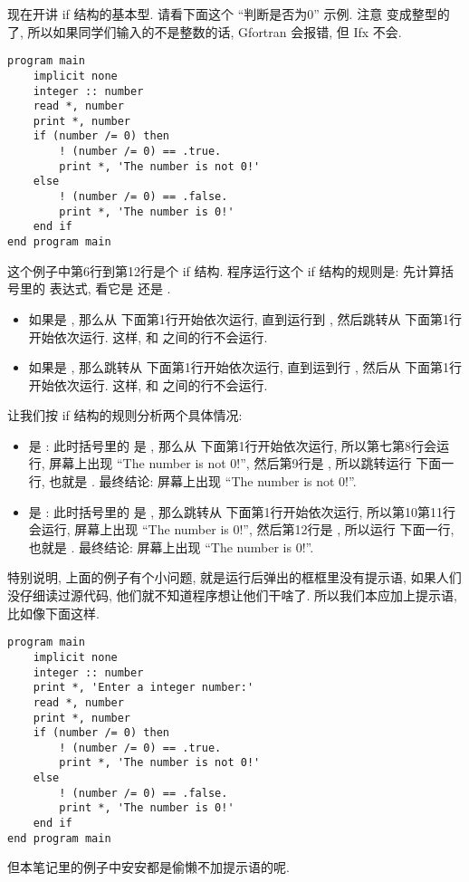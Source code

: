 现在开讲 if 结构的基本型. 请看下面这个 ``判断是否为0'' 示例. 注意  变成整型的了, 所以如果同学们输入的不是整数的话, Gfortran 会报错, 但 Ifx 不会.\label{whether_zero}
\begin{lstlisting}
program main
    implicit none
    integer :: number
    read *, number
    print *, number
    if (number /= 0) then
        ! (number /= 0) == .true.
        print *, 'The number is not 0!'
    else
        ! (number /= 0) == .false.
        print *, 'The number is 0!'
    end if
end program main
\end{lstlisting}
这个例子中第6行到第12行是个 if 结构. 程序运行这个 if 结构的规则是: 先计算括号里的 表达式, 看它是  还是 .
\begin{itemize}
    \item 如果是 , 那么从  下面第1行开始依次运行, 直到运行到  , 然后跳转从  下面第1行开始依次运行. 这样,  和  之间的行不会运行.
    \item 如果是 , 那么跳转从  下面第1行开始依次运行, 直到运到行  , 然后从  下面第1行开始依次运行. 这样,  和  之间的行不会运行.
\end{itemize}
让我们按 if 结构的规则分析两个具体情况:
\begin{itemize}
    \item {} 是 : 此时括号里的  是 , 那么从  下面第1行开始依次运行, 所以第七第8行会运行, 屏幕上出现 ``The number is not 0!'', 然后第9行是 , 所以跳转运行  下面一行, 也就是 . 最终结论: 屏幕上出现 ``The number is not 0!''.
    \item {} 是 : 此时括号里的  是 , 那么跳转从  下面第1行开始依次运行, 所以第10第11行会运行, 屏幕上出现 ``The number is 0!'', 然后第12行是 , 所以运行  下面一行, 也就是 . 最终结论: 屏幕上出现 ``The number is 0!''.
\end{itemize}

特别说明, 上面的例子有个小问题, 就是运行后弹出的框框里没有提示语, 如果人们没仔细读过源代码, 他们就不知道程序想让他们干啥了. 所以我们本应加上提示语, 比如像下面这样.
\begin{lstlisting}
program main
    implicit none
    integer :: number
    print *, 'Enter a integer number:'
    read *, number
    print *, number
    if (number /= 0) then
        ! (number /= 0) == .true.
        print *, 'The number is not 0!'
    else
        ! (number /= 0) == .false.
        print *, 'The number is 0!'
    end if
end program main
\end{lstlisting}
但本笔记里的例子中安安都是偷懒不加提示语的呢.

